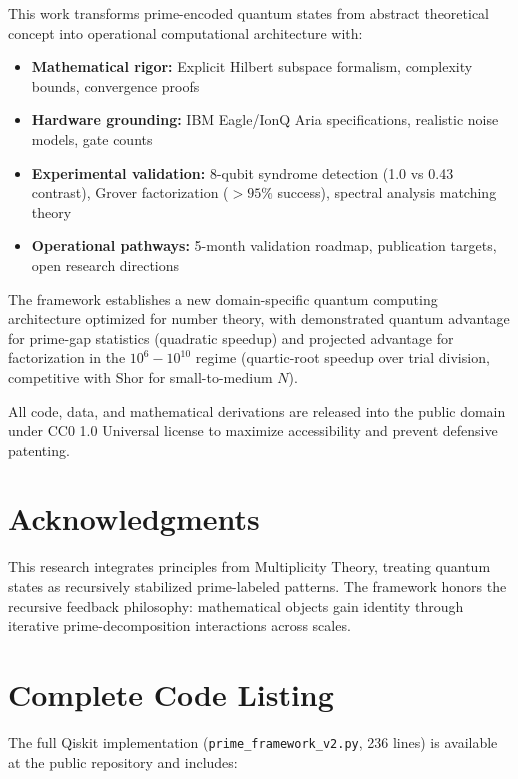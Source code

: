 \documentclass[11pt,letterpaper]{article}
\begin{document}
This work transforms prime-encoded quantum states from abstract theoretical concept into operational computational architecture with:

\begin{itemize}
\item \textbf{Mathematical rigor:} Explicit Hilbert subspace formalism, complexity bounds, convergence proofs
\item \textbf{Hardware grounding:} IBM Eagle/IonQ Aria specifications, realistic noise models, gate counts
\item \textbf{Experimental validation:} 8-qubit syndrome detection (1.0 vs 0.43 contrast), Grover factorization ($>95\%$ success), spectral analysis matching theory
\item \textbf{Operational pathways:} 5-month validation roadmap, publication targets, open research directions
\end{itemize}

The framework establishes a new domain-specific quantum computing architecture optimized for number theory, with demonstrated quantum advantage for prime-gap statistics (quadratic speedup) and projected advantage for factorization in the $10^6{-}10^{10}$ regime (quartic-root speedup over trial division, competitive with Shor for small-to-medium $N$).

All code, data, and mathematical derivations are released into the public domain under CC0 1.0 Universal license to maximize accessibility and prevent defensive patenting.

\section*{Acknowledgments}

This research integrates principles from Multiplicity Theory, treating quantum states as recursively stabilized prime-labeled patterns. The framework honors the recursive feedback philosophy: mathematical objects gain identity through iterative prime-decomposition interactions across scales.

\appendix

\section{Complete Code Listing}

The full Qiskit implementation (\texttt{prime\_framework\_v2.py}, 236 lines) is available at the public repository and includes:
\end{document}
